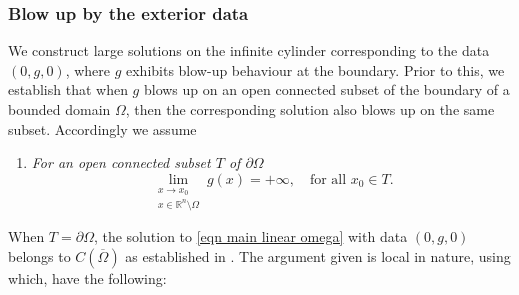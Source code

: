 \documentclass{amsart}
\makeatletter
\newtheorem{theorem}{Theorem}[section]
\newcommand{\R}{\mathbb{R}}
\newcommand{\slap}{(-\Delta)^{s}}
\newcommand{\gk}[1]{\mathbb{G}_{#1}}
\newcommand{\Ds}{D_{s}}
\newcommand{\myitem}[1]{%
\medskip \item[#1]\protected@edef\@currentlabel{#1}%
}
\makeatother
\begin{document}
\subsubsection{\textbf{Blow up by the exterior data}}\label{subsection_by exterior data}

We construct large solutions on the infinite cylinder corresponding to the data $(0,g,0)$, where $g$ exhibits blow-up behaviour at the boundary. Prior to this, we establish that when $g$ blows up on an open connected subset of the boundary of a bounded domain $\Omega$, then the corresponding solution also blows up on the same subset. Accordingly we assume 

\begin{enumerate}
    \myitem{$\textbf{(G2)}$}\label{G2}  \textit{For an open connected subset $T$ of $\partial\Omega$
    \begin{equation*}\label{bdy blowup assumption on g}
    \lim_{\substack{x \to x_{0} \\ x\in\R^{n}\setminus\Omega}} g(x)=+\infty, \quad \text{for all } x_{0} \in T.
\end{equation*}}
\end{enumerate}

When $T=\partial\Omega$, the solution to \eqref{eqn main linear omega} with data $(0,g,0)$ belongs to $C(\overline{\Omega})$ as established in \cite[Theorem 1.2]{Abatangelo2015LargesHarmonic}. The argument given is local in nature, using which, have the following:
\end{document}
